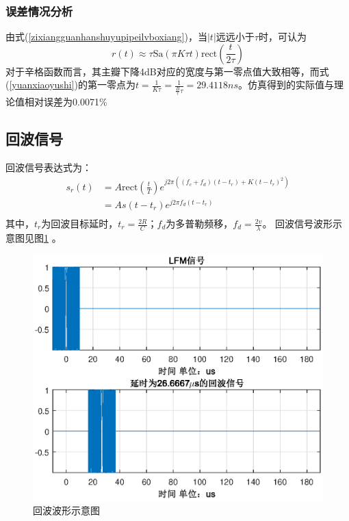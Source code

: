 \documentclass[12pt]{article}
\begin{document}
\subsubsection{误差情况分析}
由式(\ref{zixiangguanhanshuyupipeilvboxiang})，当$|t|$远远小于$\tau$时，可认为
\begin{equation}\label{yuanxiaoyushi}
  r(t)\approx\tau\mbox{Sa}(\pi K\tau t)\mbox{rect}(\frac{t}{2\tau})
\end{equation}
对于辛格函数而言，其主瓣下降4dB对应的宽度与第一零点值大致相等，而式(\ref{yuanxiaoyushi})的第一零点为$t=\frac{1}{K\tau}=\frac{1}{\frac{B}{\tau}\tau}=29.4118ns$。仿真得到的实际值与理论值相对误差为0.0071\%
\subsection{回波信号}
回波信号表达式为：
\begin{equation}\label{huiboxinhaao}
  \begin{array}{rl}
  s_r(t)&=A\mbox{rect}(\frac{t}{T})e^{j2\pi\left(\left(f_c+f_d\right)\left(t-t_r\right)+K\left(t-t_r\right)^2\right)}   \\
  & =As(t-t_r)e^{j2\pi f_d\left(t-t_r\right)}\\
  \end{array}
\end{equation}
其中，$t_r$为回波目标延时，$t_r=\frac{2R}{C}$；$f_d$为多普勒频移，$f_d=\frac{2v}{\lambda}$。
回波信号波形示意图见图\ref{huiboboxingtu}
。
\begin{figure}[htbp]
  \centering
  \includegraphics[width=\textwidth]{huiboxinghao}
  \caption{回波波形示意图}\label{huiboboxingtu}
\end{figure}
\end{document}
